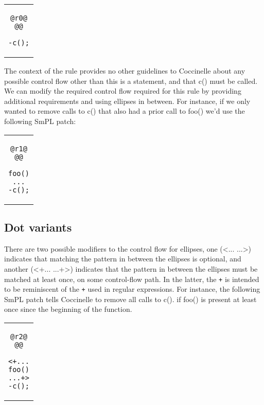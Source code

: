 \begin{center}
\begin{tabular}{c}
\begin{lstlisting}[language=Cocci]
@r0@
@@

-c();
\end{lstlisting}\\
\end{tabular}
\end{center}

The context of the rule provides no other guidelines to Coccinelle
about any possible control flow other than this is a statement, and that
c() must be called. We can modify the required control flow required for
this rule by providing additional requirements and using ellipses in between.
For instance, if we only wanted to remove calls to c() that also
had a prior call to foo() we'd use the following SmPL patch:

\begin{center}
\begin{tabular}{c}
\begin{lstlisting}[language=Cocci]
@r1@
@@

foo()
...
-c();
\end{lstlisting}\\
\end{tabular}
\end{center}

\subsection{Dot variants}
There are two possible modifiers to the control flow for ellipses, one
(<... ...>) indicates that matching the pattern in between the ellipses is
optional, and another (<+... ...+>) indicates that the pattern in between
the ellipses must be matched at least once, on some control-flow path.  In
the latter, the \texttt{+} is intended to be reminiscent of the \texttt{+}
used in regular expressions.  For instance, the following SmPL patch tells
Coccinelle to remove all calls to c(). if foo() is present at least
once since the beginning of the function.

\begin{center}
\begin{tabular}{c}
\begin{lstlisting}[language=Cocci]
@r2@
@@

<+...
foo()
...+>
-c();

\end{lstlisting}\\
\end{tabular}
\end{center}

